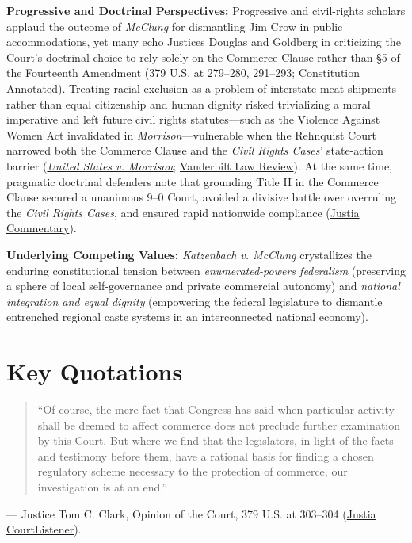 \documentclass[12pt]{article}
\begin{document}
\textbf{Progressive and Doctrinal Perspectives:} Progressive and civil-rights scholars applaud the outcome of \textit{McClung} for dismantling Jim Crow in public accommodations, yet many echo Justices Douglas and Goldberg in criticizing the Court's doctrinal choice to rely solely on the Commerce Clause rather than \S 5 of the Fourteenth Amendment (\href{https://supreme.justia.com/cases/federal/us/379/241/}{379 U.S. at 279--280, 291--293}; \href{https://constitution.congress.gov/browse/essay/artI-S8-C3-6-8/ALDE_00013425/}{Constitution Annotated}). Treating racial exclusion as a problem of interstate meat shipments rather than equal citizenship and human dignity risked trivializing a moral imperative and left future civil rights statutes---such as the Violence Against Women Act invalidated in \textit{Morrison}---vulnerable when the Rehnquist Court narrowed both the Commerce Clause and the \textit{Civil Rights Cases}' state-action barrier (\href{https://biotech.law.lsu.edu/cases/preemption/us_v_morrison.htm}{\textit{United States v. Morrison}}; \href{https://scholarship.law.vanderbilt.edu/cgi/viewcontent.cgi?article=1531&context=vlr}{Vanderbilt Law Review}). At the same time, pragmatic doctrinal defenders note that grounding Title II in the Commerce Clause secured a unanimous 9--0 Court, avoided a divisive battle over overruling the \textit{Civil Rights Cases}, and ensured rapid nationwide compliance (\href{https://supreme.justia.com/cases/federal/us/379/294/}{Justia Commentary}).

\textbf{Underlying Competing Values:} \textit{Katzenbach v. McClung} crystallizes the enduring constitutional tension between \textit{enumerated-powers federalism} (preserving a sphere of local self-governance and private commercial autonomy) and \textit{national integration and equal dignity} (empowering the federal legislature to dismantle entrenched regional caste systems in an interconnected national economy).

\section{Key Quotations}

\begin{quote}
``Of course, the mere fact that Congress has said when particular activity shall be deemed to affect commerce does not preclude further examination by this Court. But where we find that the legislators, in light of the facts and testimony before them, have a rational basis for finding a chosen regulatory scheme necessary to the protection of commerce, our investigation is at an end.''
\end{quote}
\noindent --- Justice Tom C. Clark, Opinion of the Court, 379 U.S. at 303--304 (\href{https://supreme.justia.com/cases/federal/us/379/294/}{Justia} \textbar{} \href{https://www.courtlistener.com/opinion/106951/katzenbach-v-mcclung/}{CourtListener}).
\end{document}
